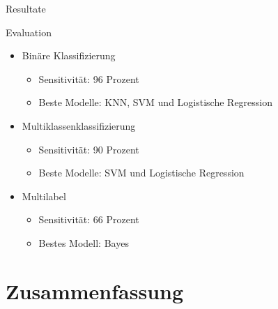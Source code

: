 \documentclass[aspectratio=169]{beamer} %
\begin{document}
\begin{frame}{Resultate}
    \begin{block}{Evaluation}
        \begin{itemize}
            \item Binäre Klassifizierung
                  \begin{itemize}
                      \item Sensitivität: 96 Prozent
                      \item Beste Modelle: KNN, SVM und Logistische Regression
                  \end{itemize}
            \item Multiklassenklassifizierung
                  \begin{itemize}
                      \item Sensitivität: 90 Prozent
                      \item Beste Modelle: SVM und Logistische Regression
                  \end{itemize}
            \item Multilabel
                  \begin{itemize}
                      \item Sensitivität: 66 Prozent
                      \item Bestes Modell: Bayes
                  \end{itemize}
        \end{itemize}
    \end{block}
\end{frame}

\section{Zusammenfassung}
\end{document}
